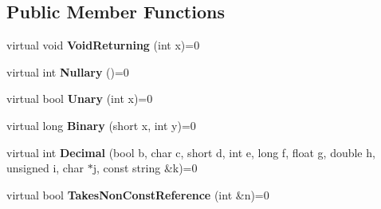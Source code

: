 \subsection*{Public Member Functions}
\begin{DoxyCompactItemize}
\item 
\mbox{\label{classtesting_1_1gmock__generated__function__mockers__test_1_1_foo_interface_adf968115cf1260004d8abe372dc71c85}} 
virtual void {\bfseries Void\+Returning} (int x)=0
\item 
\mbox{\label{classtesting_1_1gmock__generated__function__mockers__test_1_1_foo_interface_a633e753eafa7f82dde22ecf9492f341c}} 
virtual int {\bfseries Nullary} ()=0
\item 
\mbox{\label{classtesting_1_1gmock__generated__function__mockers__test_1_1_foo_interface_ae0885ac29bc4a3f180f6573d8b1a341e}} 
virtual bool {\bfseries Unary} (int x)=0
\item 
\mbox{\label{classtesting_1_1gmock__generated__function__mockers__test_1_1_foo_interface_a59ea28b711ece054ce9d57c2dc574ba0}} 
virtual long {\bfseries Binary} (short x, int y)=0
\item 
\mbox{\label{classtesting_1_1gmock__generated__function__mockers__test_1_1_foo_interface_a5c5886880581d8dd420c9a187ff884b2}} 
virtual int {\bfseries Decimal} (bool b, char c, short d, int e, long f, float g, double h, unsigned i, char $\ast$j, const string \&k)=0
\item 
\mbox{\label{classtesting_1_1gmock__generated__function__mockers__test_1_1_foo_interface_a694354adfffcee58093298bc12182ff5}} 
virtual bool {\bfseries Takes\+Non\+Const\+Reference} (int \&n)=0
\item 
\mbox{\label{classtesting_1_1gmock__generated__function__mockers__test_1_1_foo_interface_a3db03c9698ecddfc62f2a1ed2f3c32c2}} 

\end{DoxyCompactItemize}
